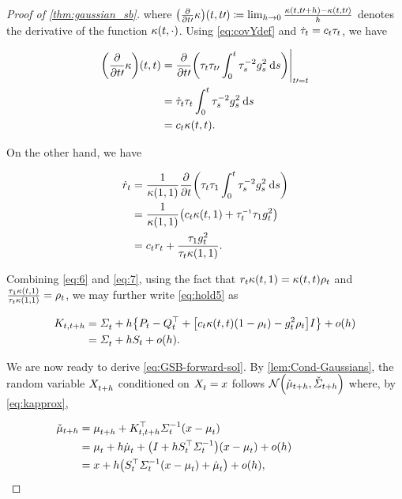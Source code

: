 \begin{proof}[Proof of \cref{thm:gaussian_sb}]
where $\parens*{\frac{\del}{\del \ctime\prime}\kernelbase }(\ctime,\ctime\prime) \defeq \lim_{h\to 0} \frac{ \kernel[\ctime][\ctime\prime+h] -\kernel[\ctime][\ctime\prime]}{h} $ denotes the derivative of the function $\kernel[\ctime][\cdot]$. Using \eqref{eq:covYdef} and $\daggtime=\drift \aggtime$, we have

\begin{align}
\parens*{\frac{\del}{\del \ctime\prime}\kernelbase }(\ctime, \ctime) &= \frac{\del}{\del \ctime\prime} \parens*{  \aggtime[\ctime]\aggtime[\ctime\prime] \intdasq }\Bigg\vert_{\ctime\prime = \ctime} \\
\nn
&= \daggtime\aggtime\intdasq \\
\label{eq:6}
&= \drift \kernel[\ctime][\ctime].
\end{align} 

On the other hand, we have

\begin{align}
\nn
\dratio &= \frac{1}{\kernel[\horizon][\horizon]} \frac{\del}{\del \ctime} \parens*{  \aggtime \aggtime[\horizon] \intdasq  } \\
\nn
&= \frac{1}{\kernel[\horizon][\horizon]} \parens*{  \drift \kernel[\ctime][\horizon] + \aggtimeinv[\ctime] \aggtime[\horizon]  \volatsq[\ctime] } \\
\label{eq:7}
&= \drift \ratio + \frac{ \aggtime[\horizon] \volatsq[\ctime]}{ \aggtime \kernel[\horizon][\horizon] }. 
\end{align}

Combining \eqref{eq:6} and \eqref{eq:7}, using the fact that $\ratio \kernel[\ctime][\horizon] = \kernel[\ctime][\ctime]\efftr$ and $\frac{ \aggtime[\horizon] \kernel[\ctime][\horizon] }{ \aggtime \kernel[\horizon][\horizon] } = \efftr$, we may further write \eqref{eq:hold5} as

\begin{align}
\nn
K_{\ctime, \ctime + h} &= \Sigmasol + h \braces*{  \Pt - \Qt^\top + \bracks*{\drift\kernel[\ctime][\ctime] \parens*{1- \efftr} - \volatsq[\ctime] \efftr} \eye } + o(h)  \\
\label{eq:kapprox}
&= \Sigmasol + h \St + o(h).
\end{align}


We are now ready to derive \eqref{eq:GSB-forward-sol}. By \cref{lem:Cond-Gaussians}, the random variable $\Xsol[\ctime+h]$ conditioned on $\Xsol = \point$ follows $\Ncal\parens*{  \muc, \Sigmac }$ where, by \eqref{eq:kapprox},

\begin{align}
\nn
\muc &= \meansol[\ctime+h] + \Kth^\top \Sigmasolinv\parens*{ \point - \meansol  } \\
\nn
&= \meansol + h \dmeansol + \parens*{ \eye + h \St^\top \Sigmasolinv } (\point - \meansol) + o(h) \hspace{20mm} \\
\label{eq:mucapprox}
&= \point + h \parens*{  \St^\top \Sigmasolinv\parens*{ \point - \meansol  } + \dmeansol } + o(h),
\end{align}


\end{proof}
